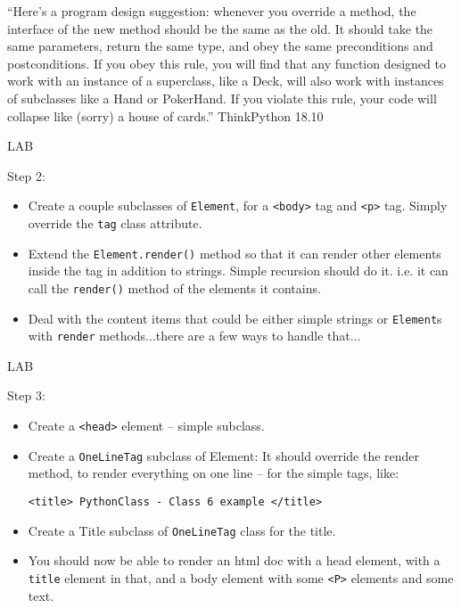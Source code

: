 \documentclass{beamer}
\begin{document}
\begin{frame}

{\Large
``Here's a program design suggestion: whenever you override a method, the
interface of the new method should be the same as the old.  It should take
the same parameters, return the same type, and obey the same preconditions
and postconditions.  If you obey this rule, you will find that any function
designed to work with an instance of a superclass, like a Deck, will also work
with instances of subclasses like a Hand or PokerHand.  If you violate this
rule, your code will collapse like (sorry) a house of cards.''
}
\vfill
\hfill ThinkPython 18.10
\end{frame}

\begin{frame}[fragile]{LAB}

\vfill
{\Large Step 2:}

\begin{itemize}
  \item  Create a couple subclasses of \verb|Element|, for a \verb|<body>| tag
         and \verb|<p>| tag. Simply override the \verb|tag| class attribute.
  \item Extend the \verb|Element.render()| method so that it can render other
        elements inside the tag in addition to strings. Simple recursion should
        do it. i.e. it can call the \verb|render()| method of the elements it
        contains.
  \item Deal with the content items that could be either simple strings or
        \verb|Element|s with \verb|render| methods...there are a few ways to handle that...
\end{itemize}

\end{frame}


\begin{frame}[fragile]{LAB}

\vfill
{\Large Step 3:}

\begin{itemize}
  \item Create a \verb|<head>| element -- simple subclass.
  \item Create a \verb|OneLineTag| subclass of Element:
        It should override the render method, to render everything on one line --
        for the simple tags, like:
    
        \verb|<title> PythonClass - Class 6 example </title>|
  \item Create a Title subclass of \verb|OneLineTag| class for the title.
  
  \item You should now be able to render an html doc with a head element, with
       a \verb|title| element in that, and a body element with some \verb|<P>|
       elements and some text.
\end{itemize}

\end{frame}
\end{document}
